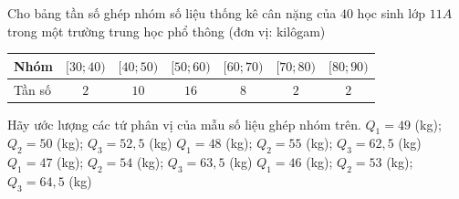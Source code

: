 \begin{ex}%
	Cho bảng tần  số ghép nhóm số liệu thống kê cân nặng của $40$ học sinh lớp $11A$ trong một trường trung học phổ thông (đơn vị: kilôgam)
	\begin{center}
		\begin{tabular}{|l|c|c|c|c|c|c|}
			\hline Nhóm & {$[30;  40)$} & {$[40; 50)$} & {$[50; 60)$} & {$[60; 70)$} & {$ [70; 80)$}& {$[80; 90)$} \\
			\hline Tần số & $2$ & $10$  & $16$ & $8$ & $2$ & $2$ \\
			\hline 
		\end{tabular}
	\end{center}
	Hãy ước lượng các tứ phân  vị của mẫu số liệu ghép nhóm trên.
	 \choice
		{$Q_{1}=49$ (kg); $Q_{2}=50$ (kg); $Q_{3}=52{,}5$  (kg)}
		{\True $ Q_{1}=48$  (kg); $Q_{2}=55$ (kg); $Q_{3}=62{,}5$ (kg)}
		{$Q_{1}=47$ (kg); $Q_{2}=54$  (kg); $Q_{3}=63{,}5$ (kg)}
		{$Q_{1}=46$ (kg); $Q_{2}=53$ (kg);  $Q_{3}=64{,}5$ (kg)}
\end{ex}

